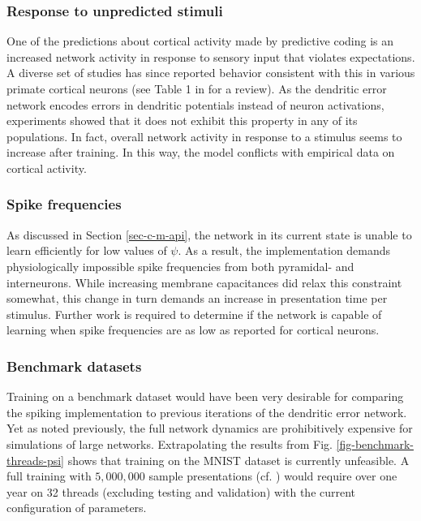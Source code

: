 \subsubsection*{Response to unpredicted stimuli}
One of the predictions about cortical activity made by predictive coding is an increased network activity in response to
sensory input that violates expectations. A diverse set of studies has since reported behavior consistent with this in
various primate cortical neurons (see Table 1 in \citep{bastos2012canonical} for a review). As the dendritic error
network encodes errors in dendritic potentials instead of neuron activations, experiments showed that it does not
exhibit this property in any of its populations. In fact, overall network activity in response to a stimulus seems to
increase after training. In this way, the model conflicts with empirical data on cortical activity.

\subsubsection*{Spike frequencies}

As discussed in Section \ref{sec-c-m-api}, the network in its current state is unable to learn efficiently for low
values of $\psi$. As a result, the implementation demands physiologically impossible spike frequencies from both
pyramidal- and interneurons. While increasing membrane capacitances did relax this constraint somewhat, this change in
turn demands an increase in presentation time per stimulus. Further work is required to determine if the network is
capable of learning when spike frequencies are as low as reported for cortical neurons.

\subsubsection*{Benchmark datasets}

Training on a benchmark dataset would have been very desirable for comparing the spiking implementation to previous
iterations of the dendritic error network. Yet as noted previously, the full network dynamics are prohibitively
expensive for simulations of large networks. Extrapolating the results from Fig. \ref{fig-benchmark-threads-psi} shows
that training on the MNIST dataset is currently unfeasible. A full training with $5,000,000$ sample
presentations (cf. \cite{Haider2021}) would require over one year on 32 threads (excluding testing and validation) with
the current configuration of parameters.

